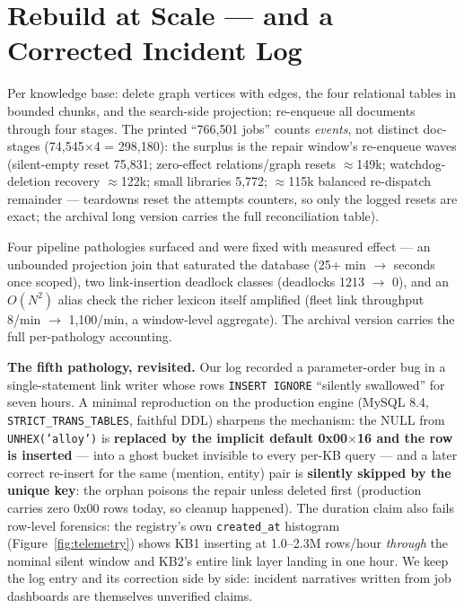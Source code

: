 \documentclass[sigconf,nonacm,anonymous]{acmart}
\begin{document}
\section{Rebuild at Scale --- and a Corrected Incident Log}\label{sec:rebuild}

Per knowledge base: delete graph vertices with edges, the four
relational tables in bounded chunks, and the search-side projection;
re-enqueue all documents through four stages. The printed
``766{,}501 jobs'' counts \emph{events}, not distinct doc-stages
(74{,}545$\times$4 = 298{,}180): the surplus is the repair window's
re-enqueue waves (silent-empty reset 75{,}831; zero-effect
relations/graph resets ${\approx}$149k; watchdog-deletion recovery
${\approx}$122k; small libraries 5{,}772; ${\approx}$115k balanced
re-dispatch remainder --- teardowns reset the attempts counters, so
only the logged resets are exact; the archival long version carries
the full reconciliation table).

Four pipeline pathologies surfaced and were fixed with measured effect
--- an unbounded projection join that saturated the database (25+ min
$\to$ seconds once scoped), two link-insertion deadlock classes
(deadlocks 1213 $\to$ 0), and an $O(N^2)$ alias check the richer
lexicon itself amplified (fleet link throughput 8/min $\to$
1{,}100/min, a window-level aggregate). The archival version carries
the full per-pathology accounting.

\textbf{The fifth pathology, revisited.} Our log recorded a
parameter-order bug in a single-statement link writer whose rows
\texttt{INSERT IGNORE} ``silently swallowed'' for seven hours. A minimal
reproduction on the production engine (MySQL 8.4,
\texttt{STRICT\_TRANS\_TABLES}, faithful DDL) sharpens the mechanism:
the NULL from \texttt{UNHEX('alloy')} is \textbf{replaced by the
implicit default 0x00$\times$16 and the row is inserted} --- into a
ghost bucket invisible to every per-KB query --- and a later correct
re-insert for the same (mention, entity) pair is \textbf{silently
skipped by the unique key}: the orphan poisons the repair unless
deleted first (production carries zero 0x00 rows today, so cleanup
happened). The duration claim also fails row-level forensics: the
registry's own \texttt{created\_at} histogram (Figure~\ref{fig:telemetry})
shows KB1 inserting at 1.0--2.3M rows/hour \emph{through} the nominal
silent window and KB2's entire link layer landing in one hour. We keep
the log entry and its correction side by side: incident narratives
written from job dashboards are themselves unverified claims.
\end{document}
